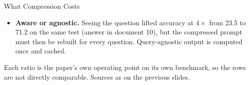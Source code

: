 \begin{frame}{What Compression Costs}
\begin{itemize}
    \item[\textcolor{red}{$\blacktriangleright$}] \textbf{Aware or agnostic.} Seeing the question lifted accuracy at $4\times$ from 23.5 to 71.2 on the same test (answer in document 10), but the compressed prompt must then be rebuilt for every question. Query-agnostic output is computed once and cached.
  \end{itemize}
  {\scriptsize Each ratio is the paper's own operating point on its own benchmark, so the rows are not directly comparable. Sources as on the previous slides.\par}
\end{frame}
